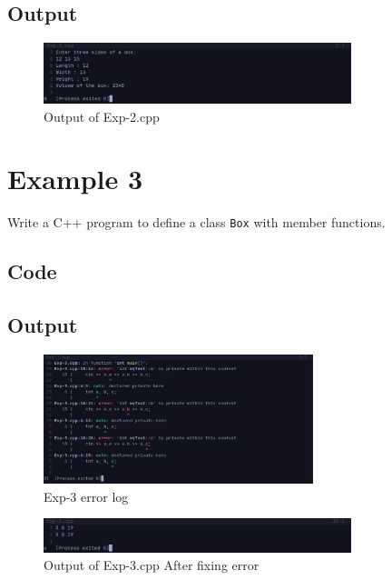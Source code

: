 \documentclass[12pt]{article}
\begin{document}
\subsection*{Output}
\begin{figure}[htpb]
    \centering
    \includegraphics[width=0.8\textwidth]{Exp-2.png}
    \caption{Output of Exp-2.cpp}
\end{figure}


\FloatBarrier
\section*{Example 3}
Write a C++ program to define a class \texttt{Box} with member functions.

\subsection*{Code}


\subsection*{Output}
\begin{figure}[htpb]
    \centering
    \includegraphics[width=0.7\textwidth]{Exp-3-Error.png}
    \caption{Exp-3 error log}
\end{figure}
\begin{figure}[htpb]
    \centering
    \includegraphics[width=0.8\textwidth]{Exp-3-Error-fixed.png}
    \caption{Output of Exp-3.cpp After fixing error}
\end{figure}
\end{document}
